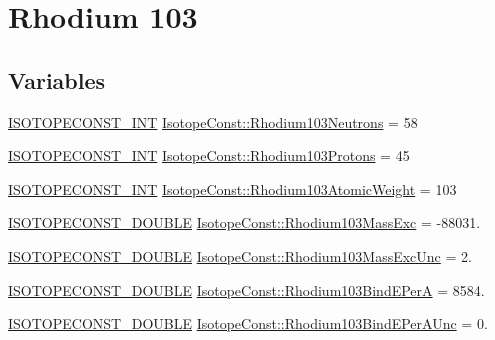 \hypertarget{group___isotope_const-_rhodium-_rh103}{}\section{Rhodium 103}
\label{group___isotope_const-_rhodium-_rh103}
\subsection*{Variables}
\begin{DoxyCompactItemize}
\item 
\mbox{\hyperlink{group___isotope_const-_macros_ga5f18360b3e99483a35c32d789e62621c}{I\+S\+O\+T\+O\+P\+E\+C\+O\+N\+S\+T\+\_\+\+I\+NT}} \mbox{\hyperlink{group___isotope_const-_rhodium-_rh103_gadc5080efec95f0ca6a1966cee0953463}{Isotope\+Const\+::\+Rhodium103\+Neutrons}} = 58
\item 
\mbox{\hyperlink{group___isotope_const-_macros_ga5f18360b3e99483a35c32d789e62621c}{I\+S\+O\+T\+O\+P\+E\+C\+O\+N\+S\+T\+\_\+\+I\+NT}} \mbox{\hyperlink{group___isotope_const-_rhodium-_rh103_ga334c12909e33cdf4f2a0bf1ecdf8a380}{Isotope\+Const\+::\+Rhodium103\+Protons}} = 45
\item 
\mbox{\hyperlink{group___isotope_const-_macros_ga5f18360b3e99483a35c32d789e62621c}{I\+S\+O\+T\+O\+P\+E\+C\+O\+N\+S\+T\+\_\+\+I\+NT}} \mbox{\hyperlink{group___isotope_const-_rhodium-_rh103_ga8cf706e87365b521a788bdc726198f15}{Isotope\+Const\+::\+Rhodium103\+Atomic\+Weight}} = 103
\item 
\mbox{\hyperlink{group___isotope_const-_macros_ga8f45a7272ce02c0b4c65c44636ed719a}{I\+S\+O\+T\+O\+P\+E\+C\+O\+N\+S\+T\+\_\+\+D\+O\+U\+B\+LE}} \mbox{\hyperlink{group___isotope_const-_rhodium-_rh103_gac42865e48596fb8fc76a05a904feb3b8}{Isotope\+Const\+::\+Rhodium103\+Mass\+Exc}} = -\/88031.
\item 
\mbox{\hyperlink{group___isotope_const-_macros_ga8f45a7272ce02c0b4c65c44636ed719a}{I\+S\+O\+T\+O\+P\+E\+C\+O\+N\+S\+T\+\_\+\+D\+O\+U\+B\+LE}} \mbox{\hyperlink{group___isotope_const-_rhodium-_rh103_ga3de72a2d188e952b6deb73af369297a9}{Isotope\+Const\+::\+Rhodium103\+Mass\+Exc\+Unc}} = 2.
\item 
\mbox{\hyperlink{group___isotope_const-_macros_ga8f45a7272ce02c0b4c65c44636ed719a}{I\+S\+O\+T\+O\+P\+E\+C\+O\+N\+S\+T\+\_\+\+D\+O\+U\+B\+LE}} \mbox{\hyperlink{group___isotope_const-_rhodium-_rh103_ga1570417b63db2740c75515af60849626}{Isotope\+Const\+::\+Rhodium103\+Bind\+E\+PerA}} = 8584.
\item 
\mbox{\hyperlink{group___isotope_const-_macros_ga8f45a7272ce02c0b4c65c44636ed719a}{I\+S\+O\+T\+O\+P\+E\+C\+O\+N\+S\+T\+\_\+\+D\+O\+U\+B\+LE}} \mbox{\hyperlink{group___isotope_const-_rhodium-_rh103_ga736c174d6146e1a635d166043b645d41}{Isotope\+Const\+::\+Rhodium103\+Bind\+E\+Per\+A\+Unc}} = 0.

\end{DoxyCompactItemize}
